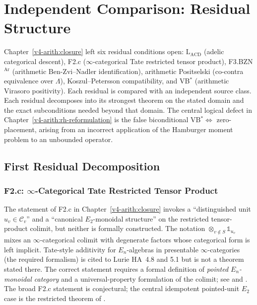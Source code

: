 \chapter{Independent Comparison: Residual Structure}
\label{v4-arith:comparison}

Chapter~\ref{v4-arith:closure} left six residual conditions open:
\(\mathrm{L}_{\mathrm{ACD}}\) (adelic categorical descent),
F2.c (\(\infty\)-categorical Tate restricted tensor product),
F3.BZN\(^{\mathrm{Ar}}\) (arithmetic Ben-Zvi--Nadler identification),
arithmetic Positselski (co-contra equivalence over \(\Lambda\)),
Koszul--Petersson compatibility, and
VB\(^{*}\) (arithmetic Virasoro positivity).
Each residual is compared with an independent source class.  Each
residual decomposes into its strongest theorem on the stated domain
and the exact subconditions needed beyond that domain.
The central logical defect in Chapter~\ref{v4-arith:rh-reformulation}
is the false biconditional
VB\(^{*}\Leftrightarrow\) zero-placement, arising from an incorrect
application of the Hamburger moment problem to an unbounded operator.

\section{First Residual Decomposition}
\label{v4-arith:sw:table}

\subsection{F2.c: \texorpdfstring{\(\infty\)}{infinity}-Categorical Tate Restricted Tensor Product}

The statement of F2.c in Chapter~\ref{v4-arith:closure} invokes a
``distinguished unit \(u_{v}\in\mathcal{C}_{v}\)'' and a ``canonical
\(E_{2}\)-monoidal structure'' on the restricted tensor-product colimit,
but neither is formally constructed. The notation
\(\otimes_{v\notin S}\mathbb{1}_{u_{v}}\) mixes an \(\infty\)-categorical
colimit with degenerate factors whose categorical form is left implicit.
Tate-style additivity for \(E_{n}\)-algebras in presentable
\(\infty\)-categories (the required formalism) is cited to Lurie
HA~4.8 and 5.1 but is not a theorem stated there.
The correct statement requires a formal definition of \emph{pointed
\(E_{n}\)-monoidal category} and a universal-property formulation of the
colimit; see  and
. The broad F2.c statement is
conjectural; the central idempotent pointed-unit \(E_{2}\) case is the
restricted theorem of .

